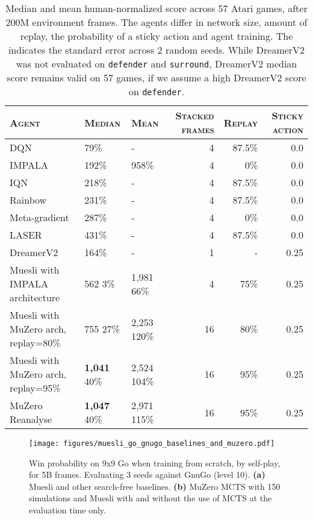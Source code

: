 \documentclass{article}
\begin{document}
\begin{table*}[tb]
\caption{Median and mean human-normalized score across 57 Atari games, after 200M environment frames. The agents differ in network size, amount of replay, the probability of a sticky action and agent training. The  indicates the standard error across 2 random seeds. While DreamerV2 was not evaluated on \texttt{defender} and \texttt{surround}, DreamerV2 median score remains valid on 57 games, if we assume a high DreamerV2 score on \texttt{defender}.
}
\label{tab:large_atari_median}
\begin{center}
\begin{small}
\begin{tabular}{lllrrr}
\toprule
\textsc{Agent} & \textsc{Median} & \textsc{Mean} & \textsc{Stacked frames} & \textsc{Replay} & \textsc{Sticky action} \\
\midrule
DQN \citep{mnih2015}    & 79\%  & - & 4 & 87.5\% & 0.0 \\
IMPALA \citep{espeholt2018impala} & 192\% & 958\% & 4 & 0\% & 0.0 \\
IQN \citep{dabney2018implicit} & 218\% & -  & 4 & 87.5\% & 0.0 \\
Rainbow \citep{hessel2018}  & 231\%  & - & 4 & 87.5\% & 0.0  \\
Meta-gradient \citep{XuHS18}    & 287\% & - & 4 & 0\% & 0.0  \\
LASER \citep{schmitt2020}   & 431\%  & - & 4 & 87.5\% & 0.0 \\
DreamerV2 \citep{hafner2020dreamerv2} & 164\% & - & 1 & - & 0.25 \\
Muesli with IMPALA architecture & 562 3\% & 1,981 66\% & 4 & 75\% & 0.25  \\
Muesli with MuZero arch, replay=80\% & 755 27\% & 2,253 120\% & 16 & 80\% & 0.25  \\
Muesli with MuZero arch, replay=95\% & \textbf{1,041} 40\% & 2,524 104\% & 16 & 95\% & 0.25  \\
MuZero Reanalyse \citep{schrittwieser2021offline} & \textbf{1,047} 40\% & 2,971 115\% & 16 & 95\% & 0.25 \\
\bottomrule
\end{tabular}
\end{small}
\end{center}
\vskip -0.1in
\end{table*}




\begin{figure}[t]
\begin{center}
\centerline{\texttt{[image: figures/muesli\_go\_gnugo\_baselines\_and\_muzero.pdf]}}
\vskip -0.12in
\caption{Win probability on 9x9 Go when training from scratch, by self-play, for 5B frames. Evaluating 3 seeds against GnuGo (level 10).
\textbf{(a)} Muesli and other search-free baselines. \textbf{(b)} MuZero MCTS with 150 simulations and Muesli with and without the use of MCTS at the evaluation time only.}
\label{fig:muesli_go_gnugo_baselines_and_muzero}
\end{center}
\vskip -0.29in
\end{figure}
\end{document}
